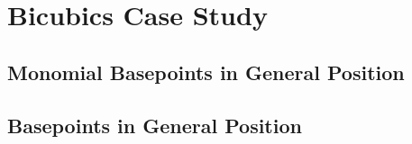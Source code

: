 \chapter{Bicubics Case Study}

\section{Monomial Basepoints in General Position}

\section{Basepoints in General Position}
